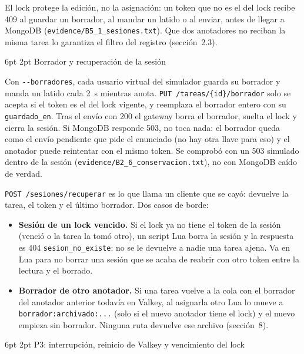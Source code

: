 \documentclass[10pt,letterpaper]{article}
\makeatletter
\newcommand{\ev}[1]{{\footnotesize\texttt{evidence/\allowbreak #1}}}
\renewcommand\subsection{\@startsection{subsection}{2}{\z@}%
  {6pt \@plus 1pt}{2pt}%
  {\normalfont\normalsize\bfseries\color{acc}}}
\makeatother
\begin{document}
El lock protege la edición, no la asignación: un token que no es el del lock recibe 409 al guardar un
borrador, al mandar un latido o al enviar, antes de llegar a MongoDB (\ev{B5\_1\_sesiones.txt}). Que dos
anotadores no reciban la misma tarea lo garantiza el filtro del registro (sección~2.3).

\subsection{Borrador y recuperación de la sesión}

Con \texttt{-{}-borradores}, cada usuario virtual del simulador guarda su borrador y manda un latido cada 2~s
mientras anota. \texttt{PUT /tareas/\{id\}/borrador} solo se acepta si el token es el del lock vigente, y
reemplaza el borrador entero con su \texttt{guardado\_en}. Tras el envío con 200 el gateway borra el
borrador, suelta el lock y cierra la sesión. Si MongoDB responde 503, no toca nada: el borrador queda
como el envío pendiente que pide el enunciado (no hay otra llave para eso) y el anotador puede reintentar
con el mismo token. Se comprobó con un 503 simulado dentro de la sesión (\ev{B2\_6\_conservacion.txt}),
no con MongoDB caído de verdad.

\texttt{POST /sesiones/recuperar} es lo que llama un cliente que se cayó: devuelve la tarea, el token y el
último borrador. Dos casos de borde:
\begin{itemize}\setlength{\itemsep}{1pt}
\item \textbf{Sesión de un lock vencido.} Si el lock ya no tiene el token de la sesión (venció o la tarea
la tomó otro), un script Lua borra la sesión y la respuesta es 404 \texttt{sesion\_no\_existe}: no se le
devuelve a nadie una tarea ajena. Va en Lua para no borrar una sesión que se acaba de reabrir con otro
token entre la lectura y el borrado.
\item \textbf{Borrador de otro anotador.} Si una tarea vuelve a la cola con el borrador del anotador
anterior todavía en Valkey, al asignarla otro Lua lo mueve a \texttt{borrador:archivado:...} (solo si el
nuevo anotador tiene el lock) y el nuevo empieza sin borrador. Ninguna ruta devuelve ese archivo
(sección~8).
\end{itemize}

\subsection{P3: interrupción, reinicio de Valkey y vencimiento del lock}
\end{document}
